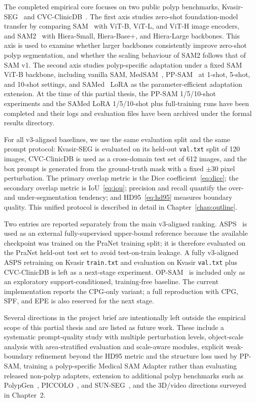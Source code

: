 The completed empirical core focuses on two public polyp benchmarks, Kvasir-SEG~\cite{jha2020kvasir} and CVC-ClinicDB~\cite{bernal2015cvc}. The first axis studies zero-shot foundation-model transfer by comparing SAM~\cite{kirillov2023sam} with ViT-B, ViT-L, and ViT-H image encoders, and SAM2~\cite{ravi2024sam2} with Hiera-Small, Hiera-Base+, and Hiera-Large backbones. This axis is used to examine whether larger backbones consistently improve zero-shot polyp segmentation, and whether the scaling behaviour of SAM2 follows that of SAM v1. The second axis studies polyp-specific adaptation under a fixed SAM ViT-B backbone, including vanilla SAM, MedSAM~\cite{ma2024medsam}, PP-SAM~\cite{rahman2024ppsam} at 1-shot, 5-shot, and 10-shot settings, and SAMed~\cite{zhang2023samed} LoRA as the parameter-efficient adaptation extension. At the time of this partial thesis, the PP-SAM 1/5/10-shot experiments and the SAMed LoRA 1/5/10-shot plus full-training runs have been completed and their logs and evaluation files have been archived under the formal results directory.

For all v3-aligned baselines, we use the same evaluation split and the same prompt protocol: Kvasir-SEG is evaluated on its held-out \texttt{val.txt} split of 120 images, CVC-ClinicDB is used as a cross-domain test set of 612 images, and the box prompt is generated from the ground-truth mask with a fixed $\pm30$ pixel perturbation. The primary overlap metric is the Dice coefficient~\eqref{eq:dice}; the secondary overlap metric is IoU~\eqref{eq:iou}; precision and recall quantify the over- and under-segmentation tendency; and HD95~\eqref{eq:hd95} measures boundary quality. This unified protocol is described in detail in Chapter~\ref{chap:outline}.

Two entries are reported separately from the main v3-aligned ranking. ASPS~\cite{li2024asps} is used as an external fully-supervised upper-bound reference because the available checkpoint was trained on the PraNet training split; it is therefore evaluated on the PraNet held-out test set to avoid test-on-train leakage. A fully v3-aligned ASPS retraining on Kvasir \texttt{train.txt} and evaluation on Kvasir \texttt{val.txt} plus CVC-ClinicDB is left as a next-stage experiment. OP-SAM~\cite{li2025opsam} is included only as an exploratory support-conditioned, training-free baseline. The current implementation reports the CPG-only variant; a full reproduction with CPG, SPF, and EPE is also reserved for the next stage.

Several directions in the project brief are intentionally left outside the empirical scope of this partial thesis and are listed as future work. These include a systematic prompt-quality study with multiple perturbation levels, object-scale analysis with area-stratified evaluation and scale-aware modules, explicit weak-boundary refinement beyond the HD95 metric and the structure loss used by PP-SAM, training a polyp-specific Medical SAM Adapter rather than evaluating released non-polyp adapters, extension to additional polyp benchmarks such as PolypGen~\cite{ali2024polypgen}, PICCOLO~\cite{gonzalez2022piccolo}, and SUN-SEG~\cite{sun2022sunseg}, and the 3D/video directions surveyed in Chapter~2.



